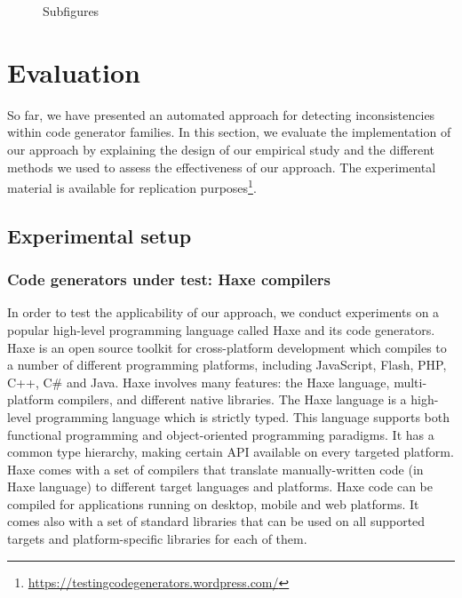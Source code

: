 \begin{figure}
	\caption{Subfigures}
\end{figure}


\section{Evaluation}
\label{sec:cg_evaluation}
So far, we have presented an automated approach for detecting inconsistencies within code generator families. In this section, we evaluate the implementation of our approach by explaining the design of our empirical study and the different methods we used to assess the effectiveness of our approach. 
The experimental material is available for replication purposes\footnote{\url{https://testingcodegenerators.wordpress.com/}}.
\subsection{Experimental setup}
\subsubsection{Code generators under test: Haxe compilers}
In order to test the applicability of our approach, we conduct experiments on a popular high-level programming language called Haxe and its code generators. Haxe is an open source toolkit for cross-platform development which compiles to a number of different programming platforms, including JavaScript, Flash, PHP, C++, C\# and Java. Haxe involves many features: the Haxe language, multi-platform compilers, and different native libraries. 
The Haxe language is a high-level programming language which is strictly typed. This language supports both functional programming and object-oriented programming paradigms. It has a common type hierarchy, making certain API available on every targeted platform.
Haxe comes with a set of compilers that translate manually-written code (in Haxe language) to different target languages and platforms. 
Haxe code can be compiled for applications running on desktop, mobile and web platforms. It comes also with a set of standard libraries that can be used on all supported targets and platform-specific libraries for each of them.

